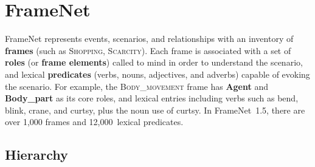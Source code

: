 \documentclass[11pt,a4paper]{article}
\newcommand{\ensuretext}[1]{#1}
\newcommand{\nssmarker}{\ensuretext{\textcolor{magenta}{\ensuremath{^{\textsc{NS}}_{\textsc{S}}}}}}
\newcommand{\arkcomment}[3]{\ensuretext{\textcolor{#3}{[#1 #2]}}}
\newcommand{\nss}[1]{\arkcomment{\nssmarker}{#1}{magenta}}
\newcommand{\fnf}[1]{\textsc{\textsf{#1}}} %
\newcommand{\fnr}[1]{\textbf{\textsf{#1}}} %
\newcommand{\fnlu}[1]{\textsf{#1}} %
\newcommand{\finalversion}[1]{#1}
\begin{document}

\section{FrameNet}\label{sec:fn}




FrameNet represents events, scenarios, and relationships 
with an inventory of \textbf{frames} (such as \fnf{Shopping}, \fnf{Scarcity}). %
Each frame is associated with a set of \textbf{roles} (or \textbf{frame elements}) 
called to mind in order to understand the scenario,
and lexical \textbf{predicates} (verbs, nouns, adjectives, and adverbs) capable of 
evoking the scenario. 
For example, the \fnf{Body\_movement} frame has \fnr{Agent} and \fnr{Body\_part} as its core roles, 
and lexical entries including verbs such as \fnlu{bend}, \fnlu{blink}, \fnlu{crane}, and \fnlu{curtsy}, 
plus the noun use of \fnlu{curtsy}.
In FrameNet~1.5, there are over 1,000 frames and 12,000~lexical predicates.



\subsection{Hierarchy}
\end{document}
